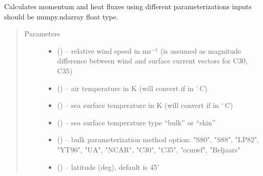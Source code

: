 \documentclass[letterpaper,10pt,english]{sphinxmanual}
\begin{document}
\begin{fulllineitems}
\label{\detokenize{index:AirSeaFluxCode.AirSeaFluxCode}} 
Calculates momentum and heat fluxes using different parameterizations
inputs should be numpy.ndarray float type.
\begin{quote}\begin{description}
\item[{Parameters}] \leavevmode\begin{itemize}
\item {} 
 (\href{https://docs.python.org/3/library/functions.html\#float}{}) -- relative wind speed in ms$^{-1}$ (is assumed as magnitude difference
between wind and surface current vectors for C30, C35)

\item {} 
 (\href{https://docs.python.org/3/library/functions.html\#float}{}) -- air temperature in K (will convert if in $^\circ$\,C)

\item {} 
 (\href{https://docs.python.org/3/library/functions.html\#float}{}) -- sea surface temperature in K (will convert if in $^\circ$\,C)

\item {} 
 (\href{https://docs.python.org/3/library/functions.html\#str}{}) -- sea surface temperature type ``bulk'' or ``skin''

\item {} 
 (\href{https://docs.python.org/3/library/stdtypes.html\#str}{}) -- bulk parameterization method option: "S80", "S88", "LP82", "YT96", "UA", "NCAR", "C30", "C35", "ecmwf", "Beljaars"

\item {} 
 (\href{https://docs.python.org/3/library/functions.html\#float}{}) -- latitude (deg), default is 45$^\circ$


\end{itemize}
\end{description}
\end{quote}
\end{fulllineitems}
\end{document}
